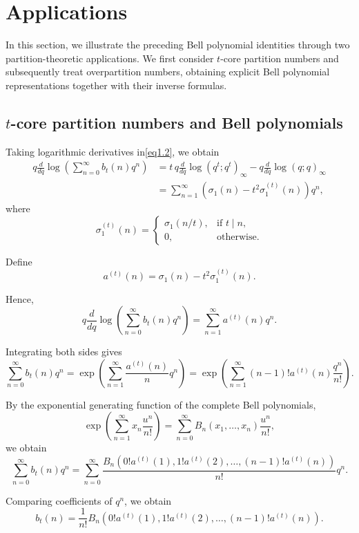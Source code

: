 \documentclass[12pt,oneside,reqno]{amsart}
\numberwithin{equation}{section}
\begin{document}
\section{Applications}

In this section, we illustrate the preceding Bell polynomial
identities through two partition-theoretic applications. We first
consider $t$-core partition numbers and subsequently treat
overpartition numbers, obtaining explicit Bell polynomial
representations together with their inverse formulas.
	\subsection{$t$-core partition numbers and Bell polynomials}
	Taking logarithmic derivatives in\eqref{eq1.2}, we obtain
	\begin{align*}
		q\frac{d}{dq}
		\log
		\left(
		\sum_{n=0}^{\infty}
		b_t(n)q^n
		\right)
		&=
		t\,
		q\frac{d}{dq}
		\log(q^t;q^t)_\infty
		-
		q\frac{d}{dq}
		\log(q;q)_\infty\\
		&=
		\sum_{n=1}^{\infty}
		\left(
		\sigma_1(n)
		-
		t^2
		\sigma_1^{(t)}(n)
		\right)
		q^n,
	\end{align*}
	where
	\[
	\sigma_1^{(t)}(n)
	=
	\begin{cases}
		\sigma_1(n/t),&\text{if }t\mid n,\\
		0,&\text{otherwise}.
	\end{cases}
	\]
	
	Define
	\[
	a^{(t)}(n)
	=
	\sigma_1(n)
	-
	t^2
	\sigma_1^{(t)}(n).
	\]
	
	Hence,
	\[
	q\frac{d}{dq}
	\log
	\left(
	\sum_{n=0}^{\infty}
	b_t(n)q^n
	\right)
	=
	\sum_{n=1}^{\infty}
	a^{(t)}(n)q^n.
	\]
	
	Integrating both sides gives
	\[
	\sum_{n=0}^{\infty}
	b_t(n)q^n
	=
	\exp
	\left(
	\sum_{n=1}^{\infty}
	\frac{a^{(t)}(n)}{n}q^n
	\right)
	=
	\exp
	\left(
	\sum_{n=1}^{\infty}
	(n-1)!a^{(t)}(n)
	\frac{q^n}{n!}
	\right).
	\]
	
	By the exponential generating function of the complete Bell polynomials,
	\[
	\exp
	\left(
	\sum_{n=1}^{\infty}
	x_n\frac{u^n}{n!}
	\right)
	=
	\sum_{n=0}^{\infty}
	B_n(x_1,\ldots,x_n)
	\frac{u^n}{n!},
	\]
	we obtain
	\[
	\sum_{n=0}^{\infty}
	b_t(n)q^n
	=
	\sum_{n=0}^{\infty}
	\frac{
		B_n
		\!\left(
		0!a^{(t)}(1),
		1!a^{(t)}(2),
		\ldots,
		(n-1)!a^{(t)}(n)
		\right)
	}{n!}
	q^n.
	\]
	
	Comparing coefficients of $q^n$, we obtain
	\[
	b_t(n)
	=
	\frac{1}{n!}
	B_n
	\!\left(
	0!a^{(t)}(1),
	1!a^{(t)}(2),
	\ldots,
	(n-1)!a^{(t)}(n)
	\right).
	\]
	
\end{document}
